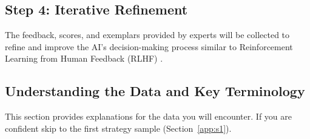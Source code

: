 \documentclass[8pt]{scrartcl}
\begin{document}
\subsection{Step 4: Iterative Refinement}

The feedback, scores, and exemplars provided by experts will be collected to refine and improve the AI’s decision-making process similar to Reinforcement Learning from Human Feedback (RLHF) \cite{Retzlaff2024HumanintheLoopRL, Pternea_2024}.

\subsection*{Understanding the Data and Key Terminology}

This section provides explanations for the data you will encounter. If you are confident skip to the first strategy sample (Section~\ref{app:s1}).
\end{document}
